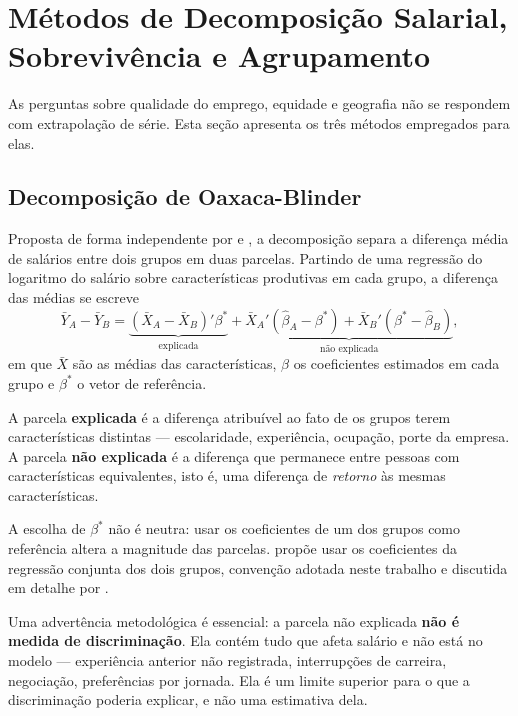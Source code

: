 \section{Métodos de Decomposição Salarial, Sobrevivência e Agrupamento}

As perguntas sobre qualidade do emprego, equidade e geografia não se respondem com extrapolação de série. Esta seção apresenta os três métodos empregados para elas.

\subsection{Decomposição de Oaxaca-Blinder}
\label{subsec:oaxaca}

Proposta de forma independente por  e , a decomposição separa a diferença média de salários entre dois grupos em duas parcelas. Partindo de uma regressão do logaritmo do salário sobre características produtivas em cada grupo, a diferença das médias se escreve
\begin{equation}
    \bar{Y}_A - \bar{Y}_B =
    \underbrace{(\bar{X}_A - \bar{X}_B)'\beta^{*}}_{\text{explicada}} +
    \underbrace{\bar{X}_A'(\hat{\beta}_A - \beta^{*}) + \bar{X}_B'(\beta^{*} - \hat{\beta}_B)}_{\text{não explicada}},
\end{equation}
em que $\bar{X}$ são as médias das características, $\hat{\beta}$ os coeficientes estimados em cada grupo e $\beta^{*}$ o vetor de referência.

A parcela \textbf{explicada} é a diferença atribuível ao fato de os grupos terem características distintas --- escolaridade, experiência, ocupação, porte da empresa. A parcela \textbf{não explicada} é a diferença que permanece entre pessoas com características equivalentes, isto é, uma diferença de \textit{retorno} às mesmas características.

A escolha de $\beta^{*}$ não é neutra: usar os coeficientes de um dos grupos como referência altera a magnitude das parcelas.  propõe usar os coeficientes da regressão conjunta dos dois grupos, convenção adotada neste trabalho e discutida em detalhe por .

Uma advertência metodológica é essencial: a parcela não explicada \textbf{não é medida de discriminação}. Ela contém tudo que afeta salário e não está no modelo --- experiência anterior não registrada, interrupções de carreira, negociação, preferências por jornada. Ela é um limite superior para o que a discriminação poderia explicar, e não uma estimativa dela.


